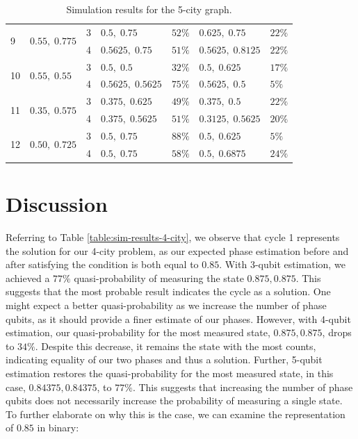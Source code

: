 \documentclass[msc,oneside]{ubcthesis}
\begin{document}
\begin{table}[ht!]
\begin{tabular}{lllllll}
			\hline
			\multirow{2}{*}{9} & \multirow{2}{*}{$0.55, \; 0.775$} & 3 & $0.5, \; 0.75$ & $52\%$ &  $0.625, \; 0.75$  & $22\%$ \\
			&                          & 4& $0.5625, \; 0.75$ & $51\%$ &  $0.5625, \; 0.8125$  & $22\%$ \\
			\hline
			\multirow{2}{*}{10} & \multirow{2}{*}{$0.55, \; 0.55$ } & 3 & $0.5, \; 0.5$ & $32\%$ &  $0.5, \; 0.625$  & $17\%$ \\
			&                          & 4& $0.5625, \; 0.5625$ & $75\%$ &  $0.5625, \; 0.5$  & $5\%$ \\
			\hline
			\multirow{2}{*}{11} & \multirow{2}{*}{$0.35, \; 0.575$} & 3 & $0.375, \; 0.625$ & $49\%$ &  $0.375, \; 0.5$  & $22\%$ \\
			&                          & 4& $0.375, \; 0.5625$ & $51\%$ &  $0.3125, \; 0.5625$  & $20\%$ \\
			\hline
			\multirow{2}{*}{12} & \multirow{2}{*}{$0.50, \; 0.725$ } & 3 & $0.5, \; 0.75$ & $88\%$ &  $0.5, \; 0.625$  & $5\%$ \\
			&                          & 4& $0.5, \; 0.75$ & $58\%$ &  $0.5, \; 0.6875$  & $24\%$ \\
			
			\bottomrule
		\end{tabular}
		\caption{Simulation results for the 5-city graph.}
		\label{table:sim-results-5-city}
	\end{table} 
	
	
 	
	
	
	\chapter{Discussion}
	
Referring to Table \ref{table:sim-results-4-city}, we observe that cycle 1 represents the solution for our 4-city problem, as our expected phase estimation before and after satisfying the condition is both equal to $0.85$. With 3-qubit estimation, we achieved a $77\%$ quasi-probability of measuring the state $0.875, 0.875$. This suggests that the most probable result indicates the cycle as a solution. One might expect a better quasi-probability as we increase the number of phase qubits, as it should provide a finer estimate of our phases. However, with 4-qubit estimation, our quasi-probability for the most measured state, $0.875, 0.875$, drops to $34\%$. Despite this decrease, it remains the state with the most counts, indicating equality of our two phases and thus a solution. Further, 5-qubit estimation restores the quasi-probability for the most measured state, in this case, $0.84375, 0.84375$, to $77\%$. This suggests that increasing the number of phase qubits does not necessarily increase the probability of measuring a single state. To further elaborate on why this is the case, we can examine the representation of $0.85$ in binary:
	
\end{document}
